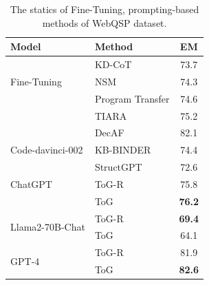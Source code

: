 \documentclass{article} %
\begin{document}
\begin{table}
\centering
\begin{tabular}{llc}
\hline
       \textbf{Model}    & \textbf{Method} &  \textbf{EM} \\ \hline
\multirow{3}{*}{Fine-Tuning}     &  KD-CoT \citep{wang2023knowledgedriven}              &  73.7 \\
                                &  NSM \citep{NSM}       & 74.3   \\  %
                                 &  Program Transfer \citep{program_transfer}                       & 74.6 \\
                                 &  TIARA \citep{grailqa1}                    & 75.2 \\
                                 &  DecAF \citep{webqsp1}                    &  82.1   \\ \hline
Code-davinci-002                 &  KB-BINDER \citep{DB-BLINDER}            &  74.4  \\ \hline
\multirow{3}{*}{ChatGPT}           &  StructGPT \citep{structgpt}              &  72.6  \\       
                               &  ToG-R              &  75.8  \\ 
                               &  ToG               &  \textbf{76.2}  \\ \hline
\multirow{2}{*}{Llama2-70B-Chat} &  ToG-R                   &  \textbf{69.4}  \\
                                 &  ToG                   & 64.1   \\ \hline
\multirow{2}{*}{GPT-4}          &  ToG-R                     &  81.9  \\
                                 &  ToG                 & \textbf{82.6}   \\ \hline
\end{tabular}
\caption{The statics of Fine-Tuning, prompting-based methods of WebQSP dataset.}
\label{tab: webqsp}
\end{table}
\end{document}
